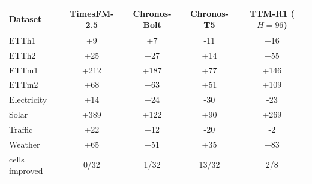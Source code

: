 \begin{tabular}{lcccc}
\toprule
Dataset & TimesFM-2.5 & Chronos-Bolt & Chronos-T5 & TTM-R1 ($H{=}96$) \\
\midrule
ETTh1 & +9 & +7 & -11 & +16 \\
ETTh2 & +25 & +27 & +14 & +55 \\
ETTm1 & +212 & +187 & +77 & +146 \\
ETTm2 & +68 & +63 & +51 & +109 \\
Electricity & +14 & +24 & -30 & -23 \\
Solar & +389 & +122 & +90 & +269 \\
Traffic & +22 & +12 & -20 & -2 \\
Weather & +65 & +51 & +35 & +83 \\
\midrule
cells improved & 0/32 & 1/32 & 13/32 & 2/8 \\
\bottomrule
\end{tabular}